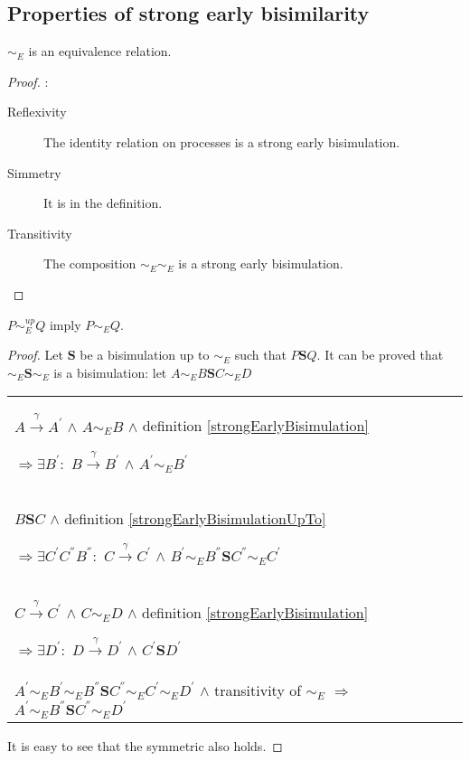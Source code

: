 \subsection{Properties of strong early bisimilarity}

\begin{proposition}
  $\sim_{E}$ is an equivalence relation.
  \begin{proof}:
    \begin{description}
      \item[Reflexivity]
	The identity relation on processes is a strong early bisimulation.
      \item[Simmetry]
	It is in the definition.
      \item[Transitivity]
	The composition $\sim_{E} \sim_{E}$ is a strong early bisimulation.
    \end{description}
  \end{proof}
\end{proposition}

\begin{proposition}\label{earlyBisimilarityUpToImplyEarlyBisimilarity}
  $P \sim_{E}^{up} Q$ imply $P \sim_{E} Q$.
  \begin{proof}
    Let $\mathbf{S}$ be a bisimulation up to $\sim_{E}$ such that $P \mathbf{S} Q$. It can be proved that $\sim_{E} \mathbf{S} \sim_{E}$ is a bisimulation: let $A \sim_{E} B \mathbf{S} C \sim_{E} D$
    \begin{center}
      \begin{tabular}{l}
	$A \xrightarrow{\gamma} A^{'}$ $\wedge$ $A \sim_{E} B$ $\wedge$ definition \ref{strongEarlyBisimulation} 
      
	$\Rightarrow \exists B^{'}:$ $B \xrightarrow{\gamma} B^{'}$ $\wedge$ $A^{'}\sim_{E} B^{'}$
      \\
	$B \mathbf{S} C$ $\wedge$ definition \ref{strongEarlyBisimulationUpTo}
      
	$\Rightarrow \exists C^{'} C^{''} B^{''}:$ $C \xrightarrow{\gamma} C^{'}$ $\wedge$ $B^{'} \sim_{E} B^{''} \mathbf{S} C^{''} \sim_{E} C^{'}$
      \\
	$C \xrightarrow{\gamma} C^{'}$ $\wedge$ $C \sim_{E} D$ $\wedge$ definition \ref{strongEarlyBisimulation} 
      
	$\Rightarrow \exists D^{'}:$ $D \xrightarrow{\gamma} D^{'}$ $\wedge$ $C^{'}\mathbf{S} D^{'}$
      \\
	$A^{'} \sim_{E} B^{'} \sim_{E} B^{''} \mathbf{S} C^{''} \sim_{E} C^{'} \sim_{E} D^{'}$ $\wedge$ transitivity of $\sim_{E}$
	$\Rightarrow$ $A^{'} \sim_{E} B^{''} \mathbf{S} C^{''} \sim_{E} D^{'}$
      \end{tabular}
    \end{center}
    It is easy to see that the symmetric also holds.
  \end{proof}
\end{proposition}


